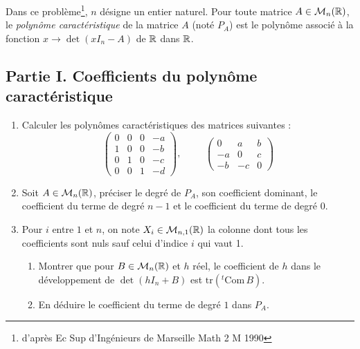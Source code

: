 Dans ce probl{\`e}me\footnote{d'apr{\`e}s Ec Sup d'Ing{\'e}nieurs de Marseille Math 2 M 1990}, $n$ d{\'e}signe un entier naturel. 
Pour toute matrice $A\in \mathcal{M}_{n}(\mathbb{R})$, le \emph{polyn{\^o}me caract{\'e}ristique} de la matrice $A$ (not{\'e} $P_{A}$) est le polyn{\^o}me associ{\'e} {\`a} la fonction $x\rightarrow \det (xI_{n}-A)$ de $\mathbb{R}$ dans $\mathbb{R}$.

\subsection*{Partie I. Coefficients du polyn{\^o}me caract{\'e}ristique}
\begin{enumerate}
\item Calculer les polyn{\^o}mes caract{\'e}ristiques des matrices suivantes :
\begin{displaymath}
\begin{pmatrix}
0 & 0 & 0 & -a\\
1 & 0 & 0 & -b\\
0 & 1 & 0 & -c\\
0 & 0 & 1 & -d
\end{pmatrix},
\hspace{1cm}
\begin{pmatrix}
0 & a & b\\
-a & 0 & c\\
-b & -c & 0
\end{pmatrix} 
\end{displaymath}

\item Soit $A\in \mathcal{M}_n(\mathbb{R})$, pr{\'e}ciser le degr{\'e} de $P_{A}$, son coefficient dominant, le coefficient du terme de degr{\'e} $n-1$ et le coefficient du terme de degr{\'e} 0.
\item Pour $i$ entre $1$ et $n$, on note $X_{i}\in \mathcal{M}_{n,1}(\mathbb{R})$ la colonne dont tous les coefficients sont nuls sauf celui d'indice $i$ qui vaut 1.
\begin{enumerate}
\item Montrer que pour $B\in \mathcal{M}_{n}(\mathbb{R})$ et $h$ r{\'e}el, le coefficient de $h$ dans le d{\'e}veloppement de $\det(hI_{n}+B)$ est $\mathrm{tr}(^{t}\mathrm{Com}\, B)$.
\item En d{\'e}duire le coefficient du terme de degré $1$ dans $P_{A}$.
\end{enumerate}
\end{enumerate}
